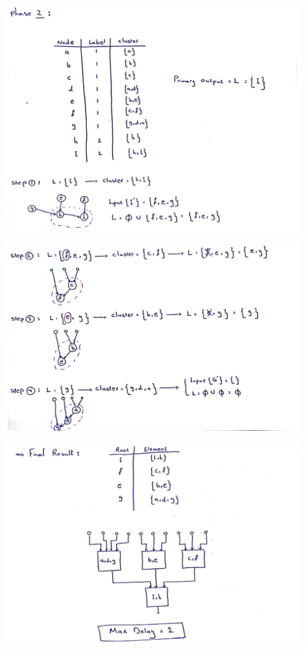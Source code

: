 \begin{qsolve}
	\begin{center}
		\includegraphics*[width=0.8\linewidth]{pics/img10.png}
	\end{center}
	
	\begin{center}
		\includegraphics*[width=0.8\linewidth]{pics/img11.png}
	\end{center}
\end{qsolve}
\newpage

\begin{qsolve}
	\begin{center}
		\includegraphics*[width=0.8\linewidth]{pics/img12.png}
	\end{center}
\end{qsolve}